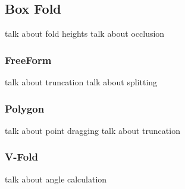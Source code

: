 \doublespacing

\subsection{Box Fold}\label{box-fold}

talk about fold heights talk about occlusion

\subsubsection{FreeForm}\label{freeform}

talk about truncation talk about splitting

\subsubsection{Polygon}\label{polygon}

talk about point dragging talk about truncation

\subsubsection{V-Fold}\label{v-fold}

talk about angle calculation
